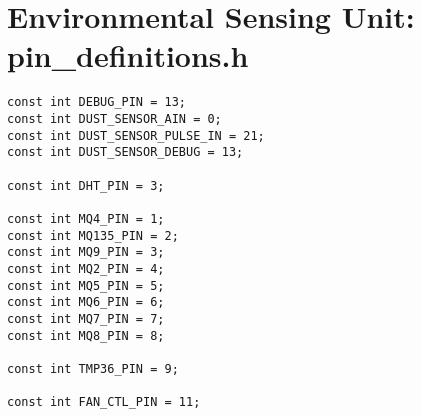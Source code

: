 \section*{Environmental Sensing Unit: pin\_definitions.h}
\begin{lstlisting}[breaklines=true,basicstyle=\tiny]
const int DEBUG_PIN = 13;
const int DUST_SENSOR_AIN = 0;
const int DUST_SENSOR_PULSE_IN = 21;
const int DUST_SENSOR_DEBUG = 13;

const int DHT_PIN = 3;

const int MQ4_PIN = 1;
const int MQ135_PIN = 2;
const int MQ9_PIN = 3;
const int MQ2_PIN = 4;
const int MQ5_PIN = 5;
const int MQ6_PIN = 6;
const int MQ7_PIN = 7;
const int MQ8_PIN = 8;

const int TMP36_PIN = 9;

const int FAN_CTL_PIN = 11;

\end{lstlisting}


\endgroup






